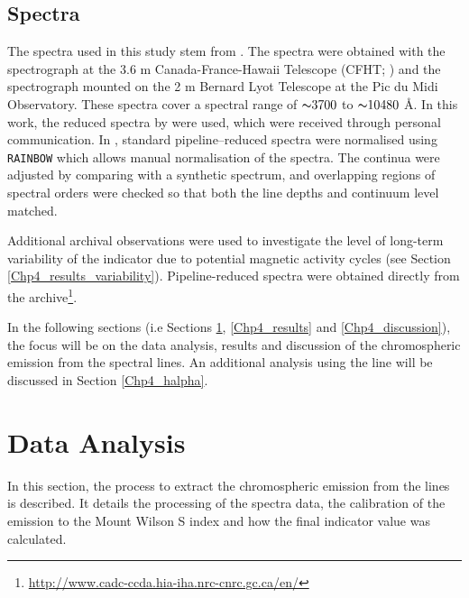 \subsection{Spectra}
\label{Chp4_obs_spectra}
The spectra used in this study stem from \citet{Bruntt_etal_2012}. The spectra were obtained with the \esp spectrograph at the 3.6 m Canada-France-Hawaii Telescope (CFHT; \citealt{Donati_etal_2006}) and the \narval spectrograph \citep{Auriere_2003} mounted on the 2 m Bernard Lyot Telescope at the Pic du Midi Observatory. These spectra cover a spectral range of ${\thicksim} 3700$ to ${\thicksim} 10480$ \AA. In this work, the reduced spectra by \citet{Bruntt_etal_2012} were used, which were received through personal communication. In \citet{Bruntt_etal_2012}, standard pipeline--reduced spectra were normalised using \texttt{RAINBOW} \citep{Bruntt_etal_2010} which allows manual normalisation of the spectra. The continua were adjusted by comparing with a synthetic spectrum, and overlapping regions of spectral orders were checked so that both the line depths and continuum level matched.

Additional archival observations were used to investigate the level of long-term variability of the \Rprime indicator due to potential magnetic activity cycles (see Section \ref{Chp4_results_variability}). Pipeline-reduced spectra were obtained directly from the \esp archive\footnote{\url{http://www.cadc-ccda.hia-iha.nrc-cnrc.gc.ca/en/}}.

In the following sections (i.e Sections \ref{Chp4_data_analysis}, \ref{Chp4_results} and \ref{Chp4_discussion}), the focus will be on the data analysis, results and discussion of the chromospheric emission from the \caII spectral lines. An additional analysis using the \Halpha line will be discussed in Section \ref{Chp4_halpha}.

\section{Data Analysis}
\label{Chp4_data_analysis}

In this section, the process to extract the chromospheric emission from the \caII lines is described. It details the processing of the spectra data, the calibration of the emission to the Mount Wilson S index and how the final \Rprime indicator value was calculated.

